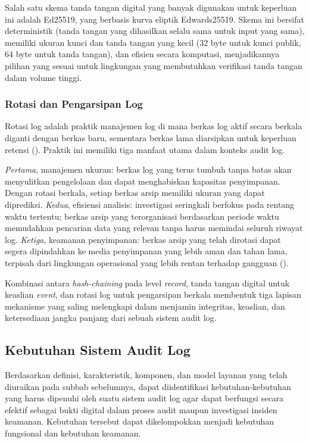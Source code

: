 Salah satu skema tanda tangan digital yang banyak digunakan untuk
keperluan ini adalah Ed25519, yang berbasis kurva eliptik Edwards25519.
Skema ini bersifat deterministik (tanda tangan yang dihasilkan selalu
sama untuk input yang sama), memiliki ukuran kunci dan tanda tangan
yang kecil (32 byte untuk kunci publik, 64 byte untuk tanda tangan),
dan efisien secara komputasi, menjadikannya pilihan yang sesuai untuk
lingkungan yang membutuhkan verifikasi tanda tangan dalam volume tinggi.

\subsubsection{Rotasi dan Pengarsipan Log}

Rotasi log adalah praktik manajemen log di mana berkas log aktif secara
berkala diganti dengan berkas baru, sementara berkas lama diarsipkan
untuk keperluan retensi (\cite{nist80092}). Praktik ini memiliki tiga
manfaat utama dalam konteks audit log.

\textit{Pertama}, manajemen ukuran: berkas log yang terus tumbuh tanpa
batas akan menyulitkan pengelolaan dan dapat menghabiskan kapasitas
penyimpanan. Dengan rotasi berkala, setiap berkas arsip memiliki ukuran
yang dapat diprediksi. \textit{Kedua}, efisiensi analisis: investigasi
seringkali berfokus pada rentang waktu tertentu; berkas arsip yang
terorganisasi berdasarkan periode waktu memudahkan pencarian data yang
relevan tanpa harus memindai seluruh riwayat log. \textit{Ketiga},
keamanan penyimpanan: berkas arsip yang telah dirotasi dapat segera
dipindahkan ke media penyimpanan yang lebih aman dan tahan lama,
terpisah dari lingkungan operasional yang lebih rentan terhadap
gangguan (\cite{nist80092}).

Kombinasi antara \textit{hash-chaining} pada level \textit{record},
tanda tangan digital untuk keaslian \textit{event}, dan rotasi log
untuk pengarsipan berkala membentuk tiga lapisan mekanisme yang saling
melengkapi dalam menjamin integritas, keaslian, dan ketersediaan jangka
panjang dari sebuah sistem audit log.


\subsection{Kebutuhan Sistem Audit Log}
\label{subsec:kebutuhan-audit-trail}

Berdasarkan definisi, karakteristik, komponen, dan model layanan yang
telah diuraikan pada subbab sebelumnya, dapat diidentifikasi
kebutuhan-kebutuhan yang harus dipenuhi oleh suatu sistem audit log
agar dapat berfungsi secara efektif sebagai bukti digital dalam proses
audit maupun investigasi insiden keamanan. Kebutuhan tersebut dapat
dikelompokkan menjadi kebutuhan fungsional dan kebutuhan keamanan.

